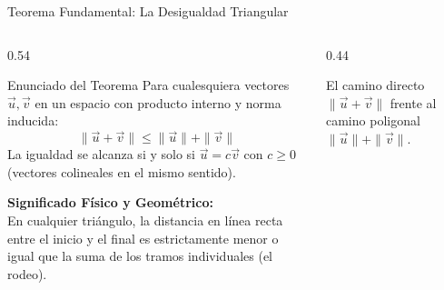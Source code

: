 \documentclass[10pt,aspectratio=169]{beamer}
\begin{document}
\begin{frame}{Teorema Fundamental: La Desigualdad Triangular}
  \begin{columns}[c]
    \begin{column}{0.54\textwidth}
      \begin{block}{Enunciado del Teorema}
        \footnotesize
        Para cualesquiera vectores $\vec{u}, \vec{v}$ en un espacio con producto interno y norma inducida:
        \[
        \boxed{\|\vec{u} + \vec{v}\| \le \|\vec{u}\| + \|\vec{v}\|}
        \]
        La igualdad se alcanza si y solo si $\vec{u} = c\vec{v}$ con $c \ge 0$ (vectores colineales en el mismo sentido).
      \end{block}
      \vspace{0.1cm}
      \footnotesize
      \textbf{Significado Físico y Geométrico:}\\[2pt]
      En cualquier triángulo, la distancia en línea recta entre el inicio y el final es estrictamente menor o igual que la suma de los tramos individuales (el rodeo).
    \end{column}
    \begin{column}{0.44\textwidth}
      \centering
      \vspace{0.08cm}

      {\scriptsize El camino directo $\|\vec{u}+\vec{v}\|$ frente al camino poligonal $\|\vec{u}\|+\|\vec{v}\|$.}
    \end{column}
  \end{columns}
\end{frame}
\end{document}
